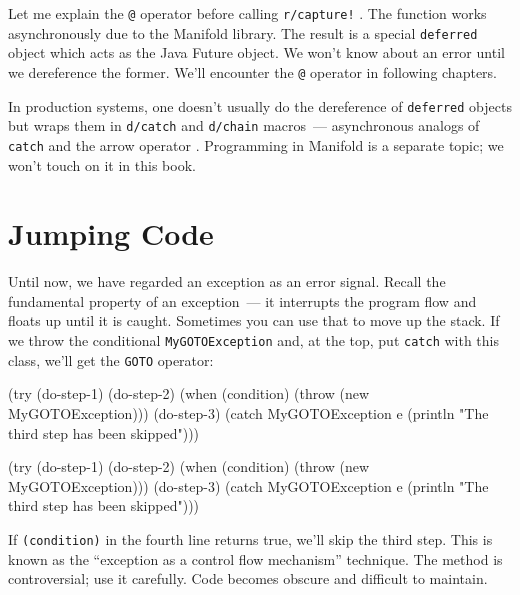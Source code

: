 \fi


Let me explain the \verb|@| operator before calling \verb|r/capture!| \ifx\DEVICETYPE\MOBILE{}\else{}\fi. The function works asynchronously due to the Manifold library. The result is a special \verb|deferred| object which acts as the Java Future object. We won't know about an error until we dereference the former. We'll encounter the \verb|@| operator in following chapters.

In production systems, one doesn't usually do the dereference of \verb|deferred| objects but wraps them in \verb|d/catch| and \verb|d/chain| macros~--- asynchronous analogs of \verb|catch| and the arrow operator \arr{}. Programming in Manifold is a separate topic; we won't touch on it in this book.

\section{Jumping Code}


Until now, we have regarded an exception as an error signal. Recall the fundamental property of an exception~--- it interrupts the program flow and floats up until it is caught. Sometimes you can use that to move up the stack. If we throw the conditional \verb|MyGOTOException| and, at the top, put \verb|catch| with this class, we'll get the \verb|GOTO| operator:

\ifx\DEVICETYPE\MOBILE

\begin{clojure/lines}
(try
  (do-step-1)
  (do-step-2)
  (when (condition)
    (throw (new MyGOTOException)))
  (do-step-3)
  (catch MyGOTOException e
    (println "The third step
                  has been skipped")))
\end{clojure/lines}

\else

\begin{clojure/lines}
(try
  (do-step-1)
  (do-step-2)
  (when (condition)
    (throw (new MyGOTOException)))
  (do-step-3)
  (catch MyGOTOException e
    (println "The third step has been skipped")))
\end{clojure/lines}

\fi

If \verb|(condition)| in the fourth line returns true, we'll skip the third
step. This is known as the ``exception as a control flow mechanism''
technique. The method is controversial; use it carefully. Code becomes obscure
and difficult to maintain.

